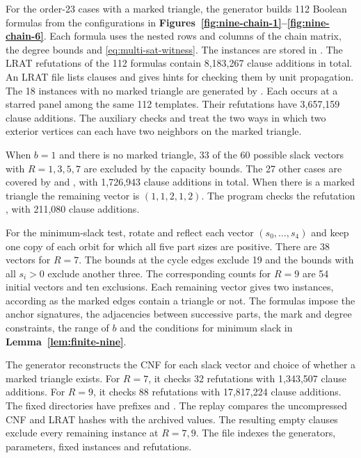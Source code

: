 For the order-23 cases with a marked triangle, the generator
 builds 112 Boolean formulas from
the configurations in \textbf{Figures~\ref{fig:nine-chain-1}--\ref{fig:nine-chain-6}}.
Each formula uses the nested rows and columns of the chain matrix,
the degree bounds and \eqref{eq:multi-sat-witness}. The instances
are stored in .
The LRAT refutations of the 112 formulas contain 8,183,267 clause
additions in total. An LRAT file lists clauses and
gives hints for checking them by unit propagation. The 18 instances
with no marked triangle are generated by .
Each occurs at a starred panel among the same 112 templates. Their
refutations have 3,657,159 clause additions. The auxiliary
checks  and  treat the two ways
in which two exterior vertices can each have two neighbors on the
marked triangle.

When $b=1$ and there is no marked triangle, 33 of the 60 possible
slack vectors with $R=1,3,5,7$ are excluded by the capacity bounds.
The 27 other cases are covered by  and
, with 1,726,943 clause additions in total.
When there is a marked triangle the remaining vector is $(1,1,2,1,2)$.
The program  checks the refutation
, with 211,080 clause additions.

For the minimum-slack test, rotate and reflect each vector
$(s_0,\ldots,s_4)$ and keep one copy of each orbit for which all five
part sizes are positive. There are 38 vectors for $R=7$. The bounds
at the cycle edges exclude 19 and the bounds with all $s_i>0$
exclude another three. The corresponding counts for $R=9$ are 54
initial vectors and ten exclusions. Each remaining vector gives two
instances, according as the marked edges contain a triangle or not.
The formulas impose the anchor signatures, the adjacencies between
successive parts, the mark and degree constraints, the range of
$b$ and the conditions for minimum slack in \textbf{Lemma~\ref{lem:finite-nine}}.

The generator  reconstructs the CNF
for each slack vector and choice of whether a marked
triangle exists. For $R=7$, it checks 32 refutations with
1,343,507 clause additions. For $R=9$, it checks 88
refutations with 17,817,224 clause additions. The fixed
directories have prefixes 
and . The replay compares the
uncompressed CNF and LRAT hashes with the archived
values.
The resulting empty clauses exclude every remaining instance at $R=7,9$.
The file  indexes the
generators, parameters, fixed instances and refutations.
